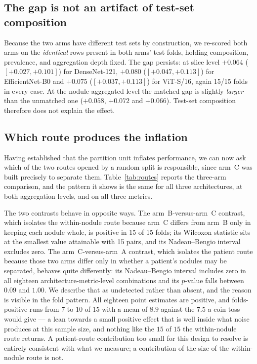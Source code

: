 \documentclass{ieeeaccess}
\begin{document}
\subsection{The gap is not an artifact of test-set composition}
Because the two arms have different test sets by construction, we re-scored both arms on the
\emph{identical} rows present in both arms' test folds, holding composition, prevalence, and
aggregation depth fixed. The gap persists: at slice level $+0.064$ ($[+0.027, +0.101]$) for
DenseNet-121, $+0.080$ ($[+0.047, +0.113]$) for EfficientNet-B0 and $+0.075$ ($[+0.037, +0.113]$)
for ViT-S/16, again 15/15 folds in every case. At the nodule-aggregated level the matched gap is
slightly \emph{larger} than the unmatched one ($+0.058$, $+0.072$ and $+0.066$). Test-set
composition therefore does not explain the effect.

\subsection{Which route produces the inflation}
\label{sec:routes}
Having established that the partition unit inflates performance, we can now ask which of the two
routes opened by a random split is responsible, since arm~C was built precisely to separate them.
Table~\ref{tab:routes} reports the three-arm comparison, and the pattern it shows is the same for
all three architectures, at both aggregation levels, and on all three metrics.

The two contrasts behave in opposite ways. The arm~B-versus-arm~C contrast, which isolates the
within-nodule route because arm~C differs from arm~B only in keeping each nodule whole, is positive
in 15 of 15 folds; its Wilcoxon statistic sits at the smallest value attainable with 15 pairs, and
its Nadeau--Bengio interval excludes zero. The arm~C-versus-arm~A contrast, which isolates the
patient route because those two arms differ only in whether a patient's nodules may be separated,
behaves quite differently: its Nadeau--Bengio interval includes zero in all eighteen
architecture-metric-level combinations and its $p$-value falls between $0.09$ and $1.00$. We describe
that as undetected rather than absent, and the reason is visible in the fold pattern. All eighteen
point estimates are positive, and folds-positive runs from $7$ to $10$ of $15$ with a mean of $8.9$
against the $7.5$ a coin toss would give --- a lean towards a small positive effect that is well
inside what noise produces at this sample size, and nothing like the $15$ of $15$ the within-nodule
route returns. A patient-route contribution too small for this design to resolve is entirely
consistent with what we measure; a contribution of the size of the within-nodule route is not.
\end{document}
